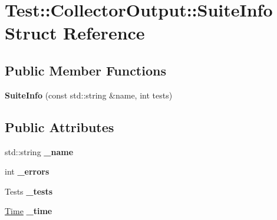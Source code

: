 \hypertarget{struct_test_1_1_collector_output_1_1_suite_info}{}\section{Test\+:\+:Collector\+Output\+:\+:Suite\+Info Struct Reference}
\label{struct_test_1_1_collector_output_1_1_suite_info}
\subsection*{Public Member Functions}
\begin{DoxyCompactItemize}
\item 
{\bfseries Suite\+Info} (const std\+::string \&name, int tests)\hypertarget{struct_test_1_1_collector_output_1_1_suite_info_a293cc820c5745fc786faf3b8e2ab9438}{}\label{struct_test_1_1_collector_output_1_1_suite_info_a293cc820c5745fc786faf3b8e2ab9438}

\end{DoxyCompactItemize}
\subsection*{Public Attributes}
\begin{DoxyCompactItemize}
\item 
std\+::string {\bfseries \+\_\+name}\hypertarget{struct_test_1_1_collector_output_1_1_suite_info_a55bdc93b43037cba310bfd69441a3f15}{}\label{struct_test_1_1_collector_output_1_1_suite_info_a55bdc93b43037cba310bfd69441a3f15}

\item 
int {\bfseries \+\_\+errors}\hypertarget{struct_test_1_1_collector_output_1_1_suite_info_aad064ab88ce0e898be5b01ae98898e0f}{}\label{struct_test_1_1_collector_output_1_1_suite_info_aad064ab88ce0e898be5b01ae98898e0f}

\item 
Tests {\bfseries \+\_\+tests}\hypertarget{struct_test_1_1_collector_output_1_1_suite_info_aeffb563714b2ba368e8c9cc92cb78091}{}\label{struct_test_1_1_collector_output_1_1_suite_info_aeffb563714b2ba368e8c9cc92cb78091}

\item 
\hyperlink{class_test_1_1_time}{Time} {\bfseries \+\_\+time}\hypertarget{struct_test_1_1_collector_output_1_1_suite_info_a50173eba0cbf1c9e77bb029809a4580e}{}\label{struct_test_1_1_collector_output_1_1_suite_info_a50173eba0cbf1c9e77bb029809a4580e}

\end{DoxyCompactItemize}


